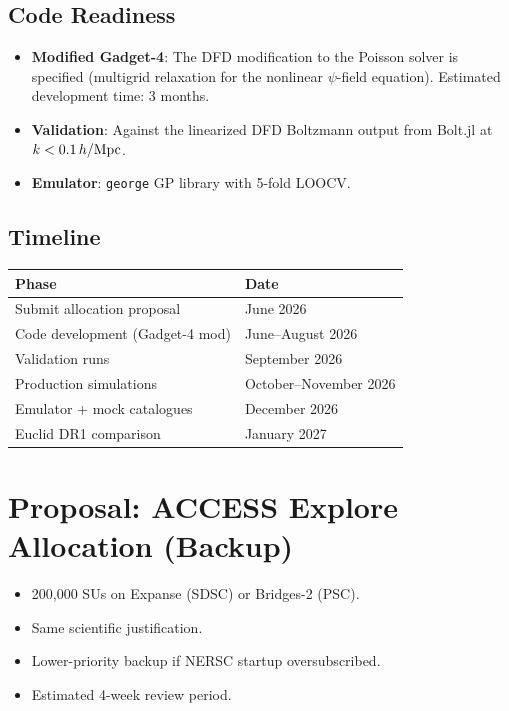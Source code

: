\documentclass[11pt,a4paper]{article}
\begin{document}
\subsection{Code Readiness}

\begin{itemize}
\item \textbf{Modified Gadget-4}: The DFD modification to the Poisson solver is specified (multigrid relaxation for the nonlinear $\psi$-field equation). Estimated development time: 3 months.
\item \textbf{Validation}: Against the linearized DFD Boltzmann output from Bolt.jl at $k < 0.1 \, h/{\rm Mpc}$.
\item \textbf{Emulator}: \texttt{george} GP library with 5-fold LOOCV.
\end{itemize}

\subsection{Timeline}

\begin{center}
\begin{tabular}{ll}
\toprule
\textbf{Phase} & \textbf{Date} \\
\midrule
Submit allocation proposal & June 2026 \\
Code development (Gadget-4 mod) & June--August 2026 \\
Validation runs & September 2026 \\
Production simulations & October--November 2026 \\
Emulator + mock catalogues & December 2026 \\
Euclid DR1 comparison & January 2027 \\
\bottomrule
\end{tabular}
\end{center}

\section{Proposal: ACCESS Explore Allocation (Backup)}

\begin{itemize}
\item 200,000 SUs on Expanse (SDSC) or Bridges-2 (PSC).
\item Same scientific justification.
\item Lower-priority backup if NERSC startup oversubscribed.
\item Estimated 4-week review period.
\end{itemize}
\end{document}
